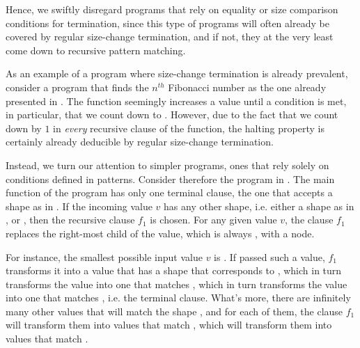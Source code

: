 Hence, we swiftly disregard programs that rely on equality or size comparison
conditions for termination, since this type of programs will often already be
covered by regular size-change termination, and if not, they at the very least
come down to recursive pattern matching.

As an example of a program where size-change termination is already prevalent,
consider a program that finds the $n^{th}$ Fibonacci number as the one already
presented in . The function 
seemingly increases a value until a condition is met, in particular, that we
count down to . However, due to the fact that we count down by $1$ in
\emph{every} recursive clause of the  function, the halting
property is certainly already deducible by regular size-change termination.

Instead, we turn our attention to simpler programs, ones that rely solely on
conditions defined in patterns. Consider therefore the program in
. The main function of the program has only
one terminal clause, the one that accepts a shape as in
. If the incoming value $v$ has any other
shape, i.e. either a shape as in ,
 or ,
then the recursive clause $f_1$ is chosen. For any given value $v$, the clause
$f_1$ replaces the right-most child of the value, which is always ,
with a node.

For instance, the smallest possible input value $v$ is . If passed such
a value, $f_1$ transforms it into a value that has a shape that corresponds to
, which in turn transforms the value into
one that matches , which in turn
transforms the value into one that matches ,
i.e. the terminal clause. What's more, there are infinitely many other values
that will match the shape , and for each
of them, the clause $f_1$ will transform them into values that match
, which will transform them into values
that match .


